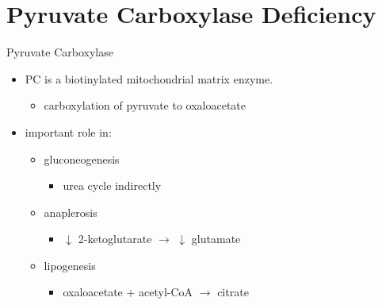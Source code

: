 \documentclass[presentation, smaller]{beamer}
\begin{document}
\section{Pyruvate Carboxylase Deficiency}
\label{sec:org7f4740f}
\begin{frame}[label={sec:orgcf88b83}]{Pyruvate Carboxylase}
\begin{itemize}
\item PC is a biotinylated mitochondrial matrix enzyme.
\begin{itemize}
\item carboxylation of pyruvate to oxaloacetate
\end{itemize}
\end{itemize}
\begin{quotation} %
\end{quotation}

\begin{itemize}
\item important role in:
\begin{itemize}
\item gluconeogenesis
\begin{itemize}
\item urea cycle indirectly
\end{itemize}
\item anaplerosis
\begin{itemize}
\item \(\downarrow\) 2-ketoglutarate \(\to\) \(\downarrow\) glutamate
\end{itemize}
\item lipogenesis
\begin{itemize}
\item oxaloacetate + acetyl-CoA \(\to\) citrate
\end{itemize}
\end{itemize}
\end{itemize}
\end{frame}
\end{document}
